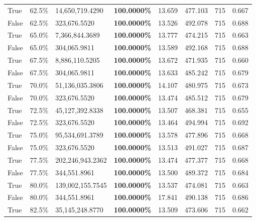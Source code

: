 \begin{table}[H]
\begin{tabular}{lllrllll}
\cline{1-8}
True & 62.5\% & 14,650,719.4290 & \bfseries \color{red} 100.0000\% & 13.659 & 477.103 & 715 & 0.667 \\
\cline{1-8}
False & 62.5\% & 323,676.5520 & \bfseries \color{red} 100.0000\% & 13.526 & 492.078 & 715 & 0.688 \\
\cline{1-8}
True & 65.0\% & 7,366,844.3689 & \bfseries \color{red} 100.0000\% & 13.777 & 474.215 & 715 & 0.663 \\
\cline{1-8}
False & 65.0\% & 304,065.9811 & \bfseries \color{red} 100.0000\% & 13.589 & 492.168 & 715 & 0.688 \\
\cline{1-8}
True & 67.5\% & 8,886,110.5205 & \bfseries \color{red} 100.0000\% & 13.672 & 471.935 & 715 & 0.660 \\
\cline{1-8}
False & 67.5\% & 304,065.9811 & \bfseries \color{red} 100.0000\% & 13.633 & 485.242 & 715 & 0.679 \\
\cline{1-8}
True & 70.0\% & 51,136,035.3806 & \bfseries \color{red} 100.0000\% & 14.107 & 480.975 & 715 & 0.673 \\
\cline{1-8}
False & 70.0\% & 323,676.5520 & \bfseries \color{red} 100.0000\% & 13.474 & 485.512 & 715 & 0.679 \\
\cline{1-8}
True & 72.5\% & 45,127,392.8338 & \bfseries \color{red} 100.0000\% & 13.507 & 468.381 & 715 & 0.655 \\
\cline{1-8}
False & 72.5\% & 323,676.5520 & \bfseries \color{red} 100.0000\% & 13.464 & 494.994 & 715 & 0.692 \\
\cline{1-8}
True & 75.0\% & 95,534,691.3789 & \bfseries \color{red} 100.0000\% & 13.578 & 477.896 & 715 & 0.668 \\
\cline{1-8}
False & 75.0\% & 323,676.5520 & \bfseries \color{red} 100.0000\% & 13.513 & 491.027 & 715 & 0.687 \\
\cline{1-8}
True & 77.5\% & 202,246,943.2362 & \bfseries \color{red} 100.0000\% & 13.474 & 477.377 & 715 & 0.668 \\
\cline{1-8}
False & 77.5\% & 344,551.8961 & \bfseries \color{red} 100.0000\% & 13.500 & 489.372 & 715 & 0.684 \\
\cline{1-8}
True & 80.0\% & 139,002,155.7545 & \bfseries \color{red} 100.0000\% & 13.537 & 474.081 & 715 & 0.663 \\
\cline{1-8}
False & 80.0\% & 344,551.8961 & \bfseries \color{red} 100.0000\% & 17.841 & 490.138 & 715 & 0.686 \\
\cline{1-8}
True & 82.5\% & 35,145,248.8770 & \bfseries \color{red} 100.0000\% & 13.509 & 473.606 & 715 & 0.662 \\

\end{tabular}
\end{table}
